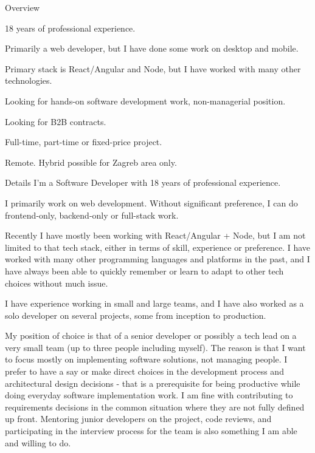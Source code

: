 \documentclass{resume}
\begin{document}
\begin{rSection}{Overview}

\begin{rList}
\item 18 years of professional experience.
\item Primarily a web developer, but I have done some work on desktop and mobile.
\item Primary stack is React/Angular and Node, but I have worked with many other technologies.
\item Looking for hands-on software development work, non-managerial position.
\item Looking for B2B contracts.
\item Full-time, part-time or fixed-price project.
\item Remote. Hybrid possible for Zagreb area only.
\end{rList}

\end{rSection}

\begin{rSection}{Details}
I'm a Software Developer with 18 years of professional experience.

I primarily work on web development. Without significant preference, I can do frontend-only, backend-only or full-stack work.

Recently I have mostly been working with React/Angular + Node, but I am not limited to that tech stack, either in terms of skill, experience or preference. I have worked with many other programming languages and platforms in the past, and I have always been able to quickly remember or learn to adapt to other tech choices without much issue.

I have experience working in small and large teams, and I have also worked as a solo developer on several projects, some from inception to production.

My position of choice is that of a senior developer or possibly a tech lead on a very small team (up to three people including myself). The reason is that I want to focus mostly on implementing software solutions, not managing people. I prefer to have a say or make direct choices in the development process and architectural design decisions - that is a prerequisite for being productive while doing everyday software implementation work. I am fine with contributing to requirements decisions in the common situation where they are not fully defined up front. Mentoring junior developers on the project, code reviews, and participating in the interview process for the team is also something I am able and willing to do.
\end{rSection}
\end{document}
